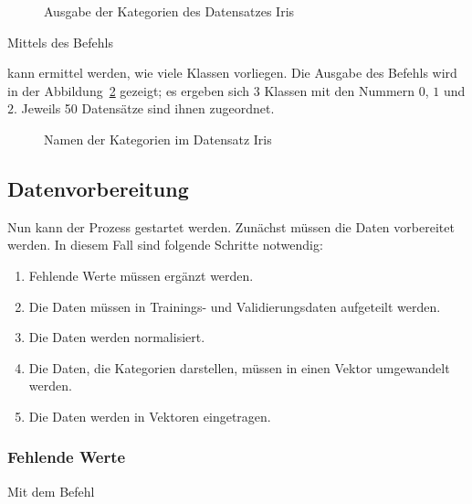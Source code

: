 

\medskip

\begin{figure}[H]
	\caption{Ausgabe der Kategorien des Datensatzes Iris}\label{TensorFlowHeadType}
\end{figure}

Mittels des Befehls 

\medskip


\medskip

kann ermittel werden, wie viele Klassen vorliegen. Die Ausgabe des Befehls wird in der Abbildung~\ref{TensorFlowIrisTypes} gezeigt; es ergeben sich 3 Klassen mit den Nummern $0$, $1$ und $2$. Jeweils 50 Datensätze sind ihnen zugeordnet.

\begin{figure}[H]
	\caption{Namen der Kategorien im Datensatz Iris}\label{TensorFlowIrisTypes}
\end{figure}


\subsection{Datenvorbereitung}

Nun kann der Prozess gestartet werden. Zunächst müssen die Daten vorbereitet werden.
In diesem Fall sind folgende Schritte notwendig: 

\begin{enumerate}
  \item Fehlende Werte müssen ergänzt werden.
  \item Die Daten müssen in Trainings- und Validierungsdaten aufgeteilt werden.
  \item Die Daten werden normalisiert.
  \item Die Daten, die Kategorien darstellen, müssen in einen Vektor umgewandelt werden.
  \item Die Daten werden in Vektoren eingetragen.
\end{enumerate}
	
\subsubsection{Fehlende Werte}

Mit dem Befehl 

